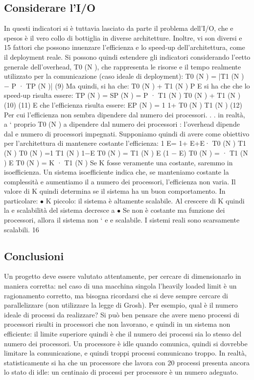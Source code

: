 \subsection{Considerare l'I/O}
In questi indicatori si è tuttavia lasciato da parte il problema dell'I/O, che
e
spesos è il vero collo di bottiglia in diverse architetture. Inoltre, vi son diversi
e
15
fattori che possono inuenzare l'efficienza e lo speed-up dell'architettura, come
il deployment reale. Si possono quindi estendere gli indicatori considerando
l'eetto generale dell'overhead, T0 (N ), che rappresenta le risorse e il tempo
realmente utilizzato per la comunicazione (caso ideale di deployment):
T0 (N ) = |T1 (N ) $-$ P · TP (N )|
(9)
Ma quindi, si ha che:
T0 (N ) + T1 (N )
P
E si ha che che lo speed-up risulta essere:
TP (N ) =
SP (N ) =
P · T1 (N )
T0 (N ) + T1 (N )
(10)
(11)
E che l'efficienza risulta essere:
EP (N ) =
1
1+
T0 (N )
T1 (N )
(12)
Per cui l'efficienza non sembra dipendere dal numero dei processori. . . in realtà,
a
` proprio T0 (N ) a dipendere dal numero dei processori : l'overhead dipende dal
e
numero di processori impegnati.
Supponiamo quindi di avere come obiettivo per l'architettura di mantenere
costante l'efficienza:
1
E=
1+
E+E·
T0 (N )
T1 (N )
T0 (N )
=1
T1 (N )
1$-$E
T0 (N )
=
T1 (N )
E
(1 $-$ E)
T0 (N ) =
· T1 (N )
E
T0 (N ) = K · T1 (N )
Se K fosse veramente una costante, saremmo in isoefficienza. Un sistema isoefficiente indica che, se manteniamo costante
la
complessità e aumentiamo il
a
numero dei processori, l'efficienza non varia. Il valore di K quindi determina se
il sistema ha un buon comportamento. In particolare:
$\bullet$ K piccolo: il sistema è altamente scalabile. Al crescere di K quindi la
e
scalabilità del sistema decresce
a
$\bullet$ Se non è costante ma funzione dei processori, allora il sistema non `
e
e
scalabile.
I sistemi reali sono scarsamente scalabili.
16
\subsection{Conclusioni}
Un progetto deve essere valutato attentamente, per cercare di dimensionarlo in maniera corretta: nel caso di una
macchina singola l'heavily loaded limit è un ragionamento corretto, ma bisogna ricordarsi che si deve sempre cercare di
parallelizzare (non utilizzare la legge di Grosh). Per esempio, qual è il numero ideale di processi da realizzare? Si
può ben pensare che avere meno processi di processori risulti in processori che non lavorano, e quindi in un sistema 
non efficiente: il limite superiore quindi è che il numero dei processi sia lo stesso del numero dei processori. Un
processore è idle quando comunica, quindi si dovrebbe limitare la comunicazione, e quindi troppi processi comunicano
troppo.
In realtà, statisticamente si ha che un processore che lavora con 20 processi presenta ancora lo stato di idle: un
centinaio di processi per processore è un numero adeguato.